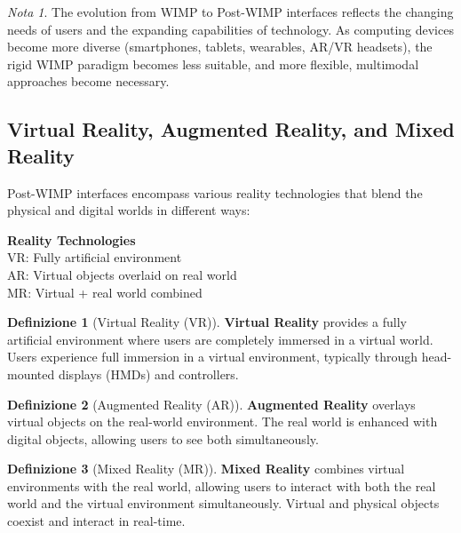 \documentclass[11pt,a4paper]{article}
\theoremstyle{definition}
\newtheorem{definition}{Definizione}[section]
\theoremstyle{plain}
\theoremstyle{remark}
\newtheorem*{remark}{Nota}
\begin{document}
\begin{remark}
The evolution from WIMP to Post-WIMP interfaces reflects the changing needs of users and the expanding capabilities of technology. As computing devices become more diverse (smartphones, tablets, wearables, AR/VR headsets), the rigid WIMP paradigm becomes less suitable, and more flexible, multimodal approaches become necessary.
\end{remark}

\subsection{Virtual Reality, Augmented Reality, and Mixed Reality}

Post-WIMP interfaces encompass various reality technologies that blend the physical and digital worlds in different ways:

\begin{center}
\colorbox{magenta!15}{\parbox{0.9\textwidth}{
\centering
\textbf{Reality Technologies}\\[0.2cm]
VR: Fully artificial environment\\
AR: Virtual objects overlaid on real world\\
MR: Virtual + real world combined
}}
\end{center}

\begin{definition}[Virtual Reality (VR)]
\textbf{Virtual Reality} provides a fully artificial environment where users are completely immersed in a virtual world. Users experience full immersion in a virtual environment, typically through head-mounted displays (HMDs) and controllers.
\end{definition}

\begin{definition}[Augmented Reality (AR)]
\textbf{Augmented Reality} overlays virtual objects on the real-world environment. The real world is enhanced with digital objects, allowing users to see both simultaneously.
\end{definition}

\begin{definition}[Mixed Reality (MR)]
\textbf{Mixed Reality} combines virtual environments with the real world, allowing users to interact with both the real world and the virtual environment simultaneously. Virtual and physical objects coexist and interact in real-time.
\end{definition}
\end{document}
